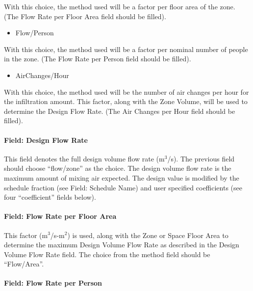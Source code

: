With this choice, the method used will be a factor per floor area of the zone. (The Flow Rate per Floor Area field should be filled).

\begin{itemize}
\tightlist
\item
  Flow/Person
\end{itemize}

With this choice, the method used will be a factor per nominal number of people in the zone. (The Flow Rate per Person field should be filled).

\begin{itemize}
\tightlist
\item
  AirChanges/Hour
\end{itemize}

With this choice, the method used will be the number of air changes per hour for the infiltration amount. This factor, along with the Zone Volume, will be used to determine the Design Flow Rate. (The Air Changes per Hour field should be filled).

\paragraph{Field: Design Flow Rate}\label{field-design-flow-rate-3}

This field denotes the full design volume flow rate (m\(^{3}\)/s). The previous field should choose ``flow/zone'' as the choice. The design volume flow rate is the maximum amount of mixing air expected. The design value is modified by the schedule fraction (see Field: Schedule Name) and user specified coefficients (see four ``coefficient'' fields below).

\paragraph{Field: Flow Rate per Floor Area}\label{field-flow-rate-per-zone-floor-area-2}

This factor (m\(^{3}\)/s-m\(^{2}\)) is used, along with the Zone or Space Floor Area to determine the maximum Design Volume Flow Rate as described in the Design Volume Flow Rate field. The choice from the method field should be ``Flow/Area''.

\paragraph{Field: Flow Rate per Person}\label{field-flow-rate-per-person-2}

